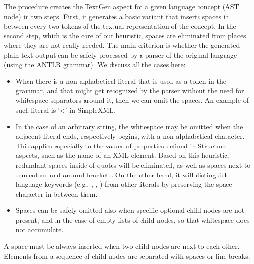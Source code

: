 The procedure creates the TextGen aspect for a given language concept (AST node) in two steps.
First, it generates a basic variant that inserts spaces in between every two tokens of the textual representation of the concept.
In the second step, which is the core of our heuristic, spaces are eliminated from places where they are not really needed.
The main criterion is whether the generated plain-text output can be safely processed by a parser of the original language (using the ANTLR grammar).
We discuss all the cases here:
\begin{itemize}
	\item When there is a non-alphabetical literal that is used as a token in the grammar, and that might get recognized by the parser without the need for whitespace separators around it, then we can omit the spaces. An example of such literal is '\textless' in SimpleXML.
	\item In the case of an arbitrary string, the whitespace may be omitted when the adjacent literal ends, respectively begins, with a non-alphabetical character.
		This applies especially to the values of properties defined in Structure aspects, such as the name of an XML element.
		Based on this heuristic, redundant spaces inside of quotes will be eliminated, as well as spaces next to semicolons and around brackets.
		On the other hand, it will distinguish language keywords (e.g., , , ) from other literals by preserving the space character in between them.
	\item Spaces can be safely omitted also when specific optional child nodes are not present, and in the case of empty lists of child nodes, so that whitespace does not accumulate.
\end{itemize}
A space must be always inserted when two child nodes are next to each other.
Elements from a sequence of child nodes are separated with spaces or line breaks.

